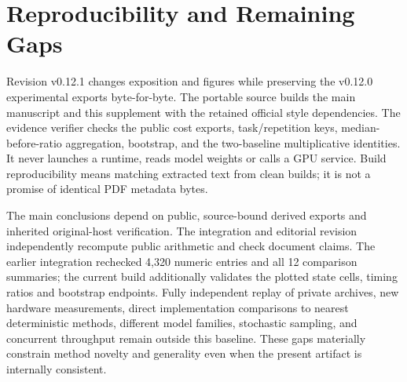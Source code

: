 \documentclass{article}
\begin{document}
\section{Reproducibility and Remaining Gaps}
Revision v0.12.1 changes exposition and figures while preserving the v0.12.0 experimental exports byte-for-byte. The portable source builds the main manuscript and this supplement with the retained official style dependencies. The evidence verifier checks the public cost exports, task/repetition keys, median-before-ratio aggregation, bootstrap, and the two-baseline multiplicative identities. It never launches a runtime, reads model weights or calls a GPU service. Build reproducibility means matching extracted text from clean builds; it is not a promise of identical PDF metadata bytes.

The main conclusions depend on public, source-bound derived exports and inherited original-host verification. The integration and editorial revision independently recompute public arithmetic and check document claims. The earlier integration rechecked 4,320 numeric entries and all 12 comparison summaries; the current build additionally validates the plotted state cells, timing ratios and bootstrap endpoints. Fully independent replay of private archives, new hardware measurements, direct implementation comparisons to nearest deterministic methods, different model families, stochastic sampling, and concurrent throughput remain outside this baseline. These gaps materially constrain method novelty and generality even when the present artifact is internally consistent.
\end{document}
